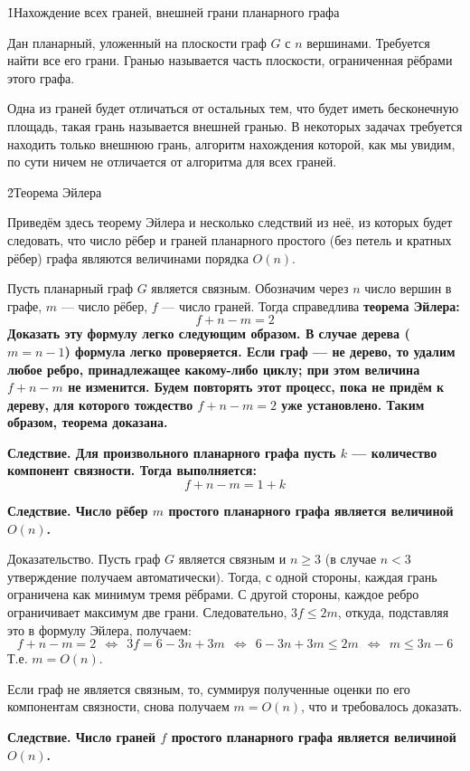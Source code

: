 \h1{Нахождение всех граней, внешней грани планарного графа}

Дан планарный, уложенный на плоскости граф $G$ с $n$ вершинами. Требуется найти все его грани. Гранью называется часть плоскости, ограниченная рёбрами этого графа.

Одна из граней будет отличаться от остальных тем, что будет иметь бесконечную площадь, такая грань называется внешней гранью. В некоторых задачах требуется находить только внешнюю грань, алгоритм нахождения которой, как мы увидим, по сути ничем не отличается от алгоритма для всех граней.


\h2{Теорема Эйлера}

Приведём здесь теорему Эйлера и несколько следствий из неё, из которых будет следовать, что число рёбер и граней планарного простого (без петель и кратных рёбер) графа являются величинами порядка $O(n)$.

Пусть планарный граф $G$ является связным. Обозначим через $n$ число вершин в графе, $m$ --- число рёбер, $f$ --- число граней. Тогда справедлива \bf{теорема Эйлера}:
$$ f + n - m = 2 $$
Доказать эту формулу легко следующим образом. В случае дерева ($m=n-1$) формула легко проверяется. Если граф --- не дерево, то удалим любое ребро, принадлежащее какому-либо циклу; при этом величина $f+n-m$ не изменится. Будем повторять этот процесс, пока не придём к дереву, для которого тождество $f+n-m=2$ уже установлено. Таким образом, теорема доказана.

\bf{Следствие}. Для произвольного планарного графа пусть $k$ --- количество компонент связности. Тогда выполняется:
$$ f + n - m = 1 + k $$

\bf{Следствие}. Число рёбер $m$ простого планарного графа является величиной $O(n)$.

Доказательство. Пусть граф $G$ является связным и $n \ge 3$ (в случае $n < 3$ утверждение получаем автоматически). Тогда, с одной стороны, каждая грань ограничена как минимум тремя рёбрами. С другой стороны, каждое ребро ограничивает максимум две грани. Следовательно, $3f \le 2m$, откуда, подставляя это в формулу Эйлера, получаем:
$$ f + n - m = 2\ \ \Leftrightarrow\ \ 3f = 6 - 3n + 3m\ \ \Leftrightarrow\ \ 6 - 3n + 3m \le 2m\ \ \Leftrightarrow\ \ m \le 3n - 6 $$
Т.е. $m = O(n)$.

Если граф не является связным, то, суммируя полученные оценки по его компонентам связности, снова получаем $m = O(n)$, что и требовалось доказать.

\bf{Следствие}. Число граней $f$ простого планарного графа является величиной $O(n)$.

